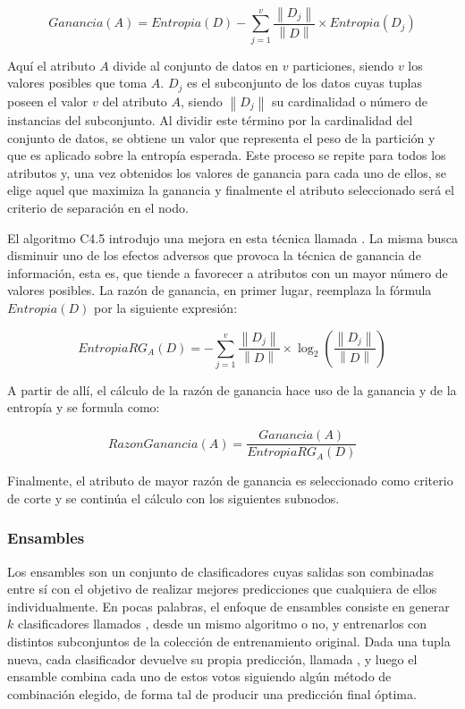 \begin{equation}
	Ganancia(A) = Entropia(D)
	- \sum_{j=1}^{v} \frac{\left\| D_{j} \right\|}{\left\| D \right\|}
	\times Entropia(D_{j})
\end{equation}

Aquí el atributo $A$ divide al conjunto de datos en $v$ particiones, siendo $v$
los valores posibles que toma $A$. $D_{j}$ es el subconjunto de los datos cuyas
tuplas poseen el valor $v$ del atributo $A$, siendo $\left\|D_{j}\right\|$ su
cardinalidad o número de instancias del subconjunto. Al dividir este término por
la cardinalidad del conjunto de datos, se obtiene un valor que representa el
peso de la partición y que es aplicado sobre la entropía esperada. Este proceso
se repite para todos los atributos y, una vez obtenidos los valores de ganancia
para cada uno de ellos, se elige aquel que maximiza la ganancia y finalmente el
atributo seleccionado será el criterio de separación en el nodo.

El algoritmo C4.5 introdujo una mejora en esta técnica llamada . La misma busca disminuir uno de los efectos adversos que provoca
la técnica de ganancia de información, esta es, que tiende a favorecer a
atributos con un mayor número de valores posibles. La razón de ganancia, en
primer lugar, reemplaza la fórmula $Entropia(D)$ por la siguiente expresión:

\begin{equation}
	EntropiaRG_{A}(D) = - \sum_{j=1}^{v} \frac{\left\| D_{j} \right\|}{\left\| D \right\|}
	\times \log_{2}(\frac{\left\| D_{j} \right\|}{\left\| D \right\|})
\end{equation}

A partir de allí, el cálculo de la razón de ganancia hace uso de la ganancia y
de la entropía y se formula como:

\begin{equation} \label{eq:gan_c45}
	RazonGanancia(A) = \frac{Ganancia(A)}{EntropiaRG_{A}(D)}
\end{equation}

Finalmente, el atributo de mayor razón de ganancia es seleccionado como criterio
de corte y se continúa el cálculo con los siguientes subnodos.

\subsubsection{Ensambles} 

Los ensambles son un conjunto de clasificadores cuyas salidas son combinadas
entre sí con el objetivo de realizar mejores predicciones que cualquiera de
ellos individualmente. En pocas palabras, el enfoque de ensambles consiste en
generar $k$ clasificadores llamados , desde un
mismo algoritmo o no, y entrenarlos con distintos subconjuntos de la colección
de entrenamiento original. Dada una tupla nueva, cada clasificador devuelve su
propia predicción, llamada , y luego el ensamble combina cada uno
de estos votos siguiendo algún método de combinación elegido, de forma tal de
producir una predicción final óptima.

